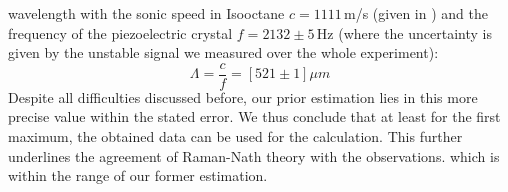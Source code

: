 wavelength with the sonic speed in Isooctane $c = 1111\,$m/s (given in \cite{staatsexamen})
and the 
frequency of the piezoelectric crystal $f =2132 \pm 5\,$Hz (where the uncertainty is given
by the unstable signal we measured over the whole experiment):
\begin{equation}
\Lambda = \frac{c}{f} = \left [521 \pm 1 \right ] \mu m
\end{equation}
Despite all difficulties discussed before, our prior estimation 
lies in this more precise value within the stated error. 
We thus conclude that at least for the first maximum, 
the obtained data can be used for the calculation. 
This further underlines the agreement of Raman-Nath theory
with the observations.
which is within the range of our former estimation. 

